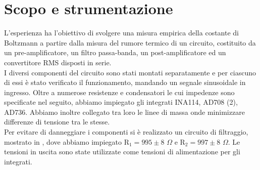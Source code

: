 \section{Scopo e strumentazione}
L'esperienza ha l'obiettivo di svolgere una misura empirica della costante di Boltzmann a partire dalla misura del rumore termico di un circuito, costituito da un pre-amplificatore, un filtro passa-banda, un post-amplificatore ed un convertitore RMS disposti in serie.\\
I diversi componenti del circuito sono stati montati separatamente e per ciascuno di essi è stato verificato il funzionamento, mandando un segnale sinusoidale in ingresso. Oltre a numerose resistenze e condensatori le cui impedenze sono specificate nel seguito, abbiamo impiegato gli integrati INA114, AD708 (2), AD736. Abbiamo inoltre collegato tra loro le linee di massa onde minimizzare differenze di tensione tra le stesse.\\
Per evitare di danneggiare i componenti si è realizzato un circuito di filtraggio, mostrato in , dove abbiamo impiegato R$_1 = 995 \pm 8$ $\Omega$ e R$_2 = 997 \pm 8$ $\Omega$. Le tensioni in uscita sono state utilizzate come tensioni di alimentazione per gli integrati.

